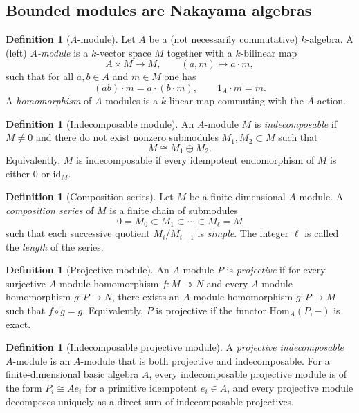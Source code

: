 \documentclass{article}
\theoremstyle{definition}
\newtheorem{definition}[theorem]{Definition}
\begin{document}
\subsection{Bounded modules are Nakayama algebras}
\begin{definition}[$A$-module]
Let $A$ be a (not necessarily commutative) $k$-algebra.
A (left) \emph{$A$-module} is a $k$-vector space $M$ together with a $k$-bilinear map
\[
A\times M\to M,\qquad (a,m)\mapsto a\cdot m,
\]
such that for all $a,b\in A$ and $m\in M$ one has
\[
(ab)\cdot m = a\cdot (b\cdot m),\qquad 1_A\cdot m = m.
\]
A \emph{homomorphism} of $A$-modules is a $k$-linear map commuting with the $A$-action.
\end{definition}

\begin{definition}[Indecomposable module]
An $A$-module $M$ is \emph{indecomposable} if $M\neq 0$ and there do not exist nonzero submodules $M_1,M_2\subset M$ such that
\[
M \cong M_1\oplus M_2.
\]
Equivalently, $M$ is indecomposable if every idempotent endomorphism of $M$ is either $0$ or $\mathrm{id}_M$.
\end{definition}

\begin{definition}[Composition series]
Let $M$ be a finite-dimensional $A$-module.
A \emph{composition series} of $M$ is a finite chain of submodules
\[
0=M_0\subset M_1\subset \cdots \subset M_{\ell}=M
\]
such that each successive quotient $M_i/M_{i-1}$ is \emph{simple}.
The integer $\ell$ is called the \emph{length} of the series.
\end{definition}

\begin{definition}[Projective module]
An $A$-module $P$ is \emph{projective} if for every surjective $A$-module homomorphism $f:M\twoheadrightarrow N$ and every $A$-module homomorphism $g:P\to N$, there exists an $A$-module homomorphism $\tilde g:P\to M$ such that $f\circ \tilde g=g$.
Equivalently, $P$ is projective if the functor $\mathrm{Hom}_A(P,-)$ is exact.
\end{definition}

\begin{definition}[Indecomposable projective module]
A \emph{projective indecomposable} $A$-module is an $A$-module that is both projective and indecomposable.
For a finite-dimensional basic algebra $A$, every indecomposable projective module is of the form $P_i\cong Ae_i$ for a primitive idempotent $e_i\in A$, and every projective module decomposes uniquely as a direct sum of indecomposable projectives.
\end{definition}
\end{document}
